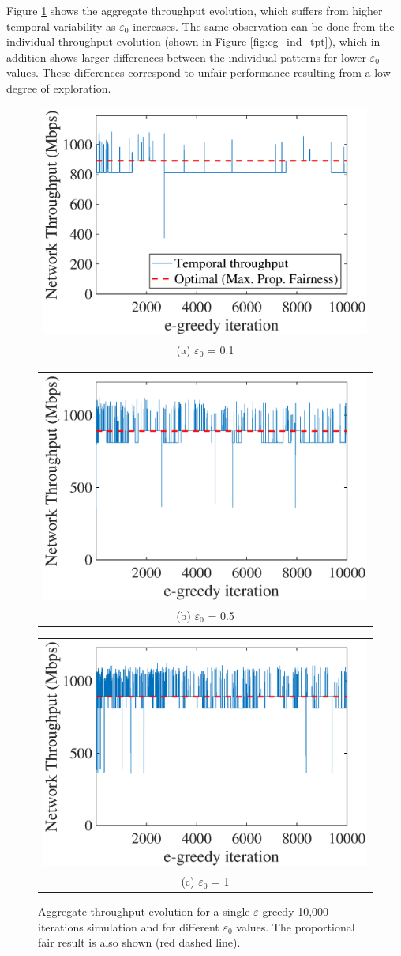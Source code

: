 \documentclass[10pt,journal,compsoc]{IEEEtran}
\begin{document}
	Figure \ref{fig:eg_agg_tpt}  shows the aggregate throughput evolution, which suffers from higher temporal variability as $\varepsilon_0$ increases. The same observation can be done from the individual throughput evolution (shown in Figure \ref{fig:eg_ind_tpt}), which in addition shows larger differences between the individual patterns for lower $\varepsilon_0$ values. These differences correspond to unfair performance resulting from a low degree of exploration.
	\begin{figure}
		\centering
		\begin{tabular}{@{}c@{}}
			\includegraphics[width=.25\textwidth]{images/NEW_temporal_aggregate_tpt_e-greedy_e01} \\[\abovecaptionskip]
			\small (a) $\varepsilon_0$ = 0.1
			\label{fig:eg_e01_agg_tpt}
		\end{tabular}	
		\hspace{\floatsep}	
		\begin{tabular}{@{}c@{}}
			\includegraphics[width=.25\textwidth]{images/NEW_temporal_aggregate_tpt_e-greedy_e05} \\[\abovecaptionskip]
			\small (b) $\varepsilon_0$ = 0.5
			\label{fig:eg_e05_agg_tpt}
		\end{tabular}
		\hspace{\floatsep}
		\begin{tabular}{@{}c@{}}
			\includegraphics[width=.25\textwidth]{images/NEW_temporal_aggregate_tpt_e-greedy_e1} \\[\abovecaptionskip]
			\small (c) $\varepsilon_0$ = 1
			\label{fig:eg_e1_agg_tpt}
		\end{tabular}
		\caption{Aggregate throughput evolution for a single $\varepsilon$-greedy 10,000-iterations simulation and for different $\varepsilon_0$ values. The proportional fair result is also shown (red dashed line).}
		\label{fig:eg_agg_tpt}
	\end{figure}
\end{document}
